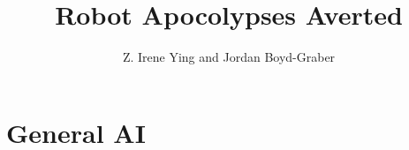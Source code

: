 \documentclass[a4paper,twosided,justified,nobib]{tufte-book}
\title{Robot Apocolypses Averted}
\author{Z. Irene Ying and Jordan Boyd-Graber}
\begin{document}

\frontmatter





\chapter{General AI}
\label{chap:gai}





\backmatter





\printindex
\end{document}
